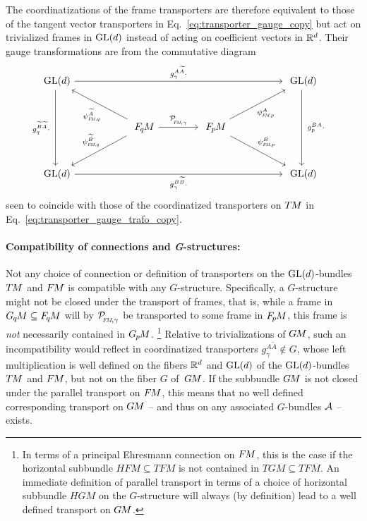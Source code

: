 The coordinatizations of the frame transporters are therefore equivalent to those of the tangent vector transporters in Eq.~\eqref{eq:transporter_gauge_copy} but act on trivialized frames in $\operatorname{GL}(d)$ instead of acting on coefficient vectors in $\mathbb{R}^{d}$.
Their gauge transformations are from the commutative diagram
\begin{equation}\label{cd:FM_transport_trivialization}
\begin{tikzcd}[column sep=53pt, row sep=30, font=\normalsize]
    \GL{d}
        \arrow[dd, "g_q^{\widetilde{B}\widetilde{A}}\cdot\ "']
        \arrow[rrr, "g_\gamma^{A\widetilde{A}}\cdot"]
    & &[-3ex] &
    \GL{d}
        \arrow[dd, "\ g_p^{BA}\cdot"]
    \\
    &
    \FqM
        \arrow[ul, "\psiFMq^{\widetilde{A}}", pos=.45]
        \arrow[dl, "\psiFMq^{\widetilde{B}}"', pos=.45]
        \arrow[r, "\PFMgamma"]
    &
    \FpM
        \arrow[ur, "\psiFMp^A"', pos=.45]
        \arrow[dr, "\psiFMp^B", pos=.45]
    \\
    \GL{d}
        \arrow[rrr, "g_\gamma^{B\widetilde{B}}\cdot"']
    & & &
    \GL{d}
\end{tikzcd}
\quad
\end{equation}
seen to coincide with those of the coordinatized transporters on $T\mkern-1.5muM$ in Eq.~\eqref{eq:transporter_gauge_trafo_copy}.





\paragraph{Compatibility of connections and \textit{G}-structures:}

Not any choice of connection or definition of transporters on the $\operatorname{GL}(d)$-bundles $T\mkern-1.5muM$ and $F\mkern-1.5muM$ is compatible with any $G$-structure.
Specifically, a $G$-structure might not be closed under the transport of frames, that is,
while a frame in $G_{\mkern-1.3mu q}\mkern-1.3muM \subseteq F_{\mkern-1.5mu q}\mkern-1.1muM$ will by $\PFMgamma$ be transported to some frame in $F_{\mkern-1.5mu p}\mkern-1.0muM$, this frame is \emph{not} necessarily contained in $G_{\mkern-1.3mu p}\mkern-1.2muM$.%
\footnote{
    In terms of a principal Ehresmann connection on $F\mkern-1.5muM$, this is the case if the horizontal subbundle $HFM \subseteq TFM$ is not contained in $TGM \subseteq TFM$.
    An immediate definition of parallel transport in terms of a choice of horizontal subbundle $HGM$ on the $G$-structure will always (by definition) lead to a well defined transport on $G\mkern-1.4muM$.
}
Relative to trivializations of $G\mkern-1.4muM$, such an incompatibility would reflect in coordinatized transporters ${g_\gamma^{A\widetilde{A}} \notin G}$, whose left multiplication is well defined on the fibers $\mathbb{R}^d$ and $\operatorname{GL}(d)$ of the $\operatorname{GL}(d)$-bundles $T\mkern-1.5muM$ and $F\mkern-1.5muM$, but not on the fiber $G$ of~$G\mkern-1.4muM$.
If the subbundle $G\mkern-1.4muM$ is not closed under the parallel transport on $F\mkern-1.5muM$, this means that no well defined corresponding transport on $G\mkern-1.4muM$ -- and thus on any associated $G$-bundles $\mathcal{A}$ -- exists.

